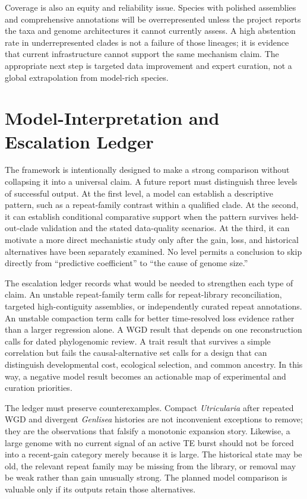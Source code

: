 \documentclass[conference]{IEEEtran}
\begin{document}
Coverage is also an equity and reliability issue. Species with polished assemblies and comprehensive annotations will be overrepresented unless the project reports the taxa and genome architectures it cannot currently assess. A high abstention rate in underrepresented clades is not a failure of those lineages; it is evidence that current infrastructure cannot support the same mechanism claim. The appropriate next step is targeted data improvement and expert curation, not a global extrapolation from model-rich species.

\section{Model-Interpretation and Escalation Ledger}

The framework is intentionally designed to make a strong comparison without collapsing it into a universal claim. A future report must distinguish three levels of successful output. At the first level, a model can establish a descriptive pattern, such as a repeat-family contrast within a qualified clade. At the second, it can establish conditional comparative support when the pattern survives held-out-clade validation and the stated data-quality scenarios. At the third, it can motivate a more direct mechanistic study only after the gain, loss, and historical alternatives have been separately examined. No level permits a conclusion to skip directly from “predictive coefficient” to “the cause of genome size.”

The escalation ledger records what would be needed to strengthen each type of claim. An unstable repeat-family term calls for repeat-library reconciliation, targeted high-contiguity assemblies, or independently curated repeat annotations. An unstable compaction term calls for better time-resolved loss evidence rather than a larger regression alone. A WGD result that depends on one reconstruction calls for dated phylogenomic review. A trait result that survives a simple correlation but fails the causal-alternative set calls for a design that can distinguish developmental cost, ecological selection, and common ancestry. In this way, a negative model result becomes an actionable map of experimental and curation priorities.

The ledger must preserve counterexamples. Compact \emph{Utricularia} after repeated WGD and divergent \emph{Genlisea} histories are not inconvenient exceptions to remove; they are the observations that falsify a monotonic expansion story. Likewise, a large genome with no current signal of an active TE burst should not be forced into a recent-gain category merely because it is large. The historical state may be old, the relevant repeat family may be missing from the library, or removal may be weak rather than gain unusually strong. The planned model comparison is valuable only if its outputs retain those alternatives.
\end{document}
